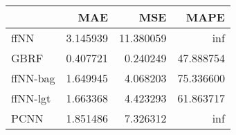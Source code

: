 \begin{tabular}{lrrr}
\toprule
{} &       MAE &        MSE &       MAPE \\
\midrule
ffNN     &  3.145939 &  11.380059 &        inf \\
GBRF     &  0.407721 &   0.240249 &  47.888754 \\
ffNN-bag &  1.649945 &   4.068203 &  75.336600 \\
ffNN-lgt &  1.663368 &   4.423293 &  61.863717 \\
PCNN     &  1.851486 &   7.326312 &        inf \\
\bottomrule
\end{tabular}
